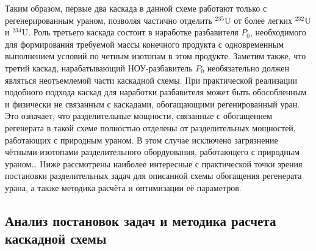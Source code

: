 Таким образом, первые два каскада в данной схеме работают только с регенерированным ураном, позволяя частично отделить $^{235}$U от более легких $^{232}$U и $^{234}$U. Роль третьего каскада состоит в наработке разбавителя $P_{0}$, необходимого для формирования требуемой массы конечного продукта с одновременным выполнением условий по четным изотопам в этом продукте. Заметим также, что третий каскад, нарабатывающий НОУ-разбавитель $P_{0}$ необязательно должен являться неотъемлемой части каскадной схемы. При практической реализации подобного подхода каскад для наработки разбавителя может быть обособленным и физически не связанным с каскадами, обогащающими регенированный уран. Это означает, что разделительные мощности, связанные с обогащением регенерата в такой схеме полностью отделены от разделительных мощностей, работающих с природным ураном. В этом случае исключено загрязнение чётными изотопами разделительного обордуования, работающего с природным ураном\dots
Ниже рассмотрены наиболее интересные с практической точки зрения постановки разделительных задач для описанной схемы обогащения регенерата урана, а также методика расчёта и оптимизации её параметров.


\subsection{Анализ постановок задач и методика расчета каскадной схемы} 

